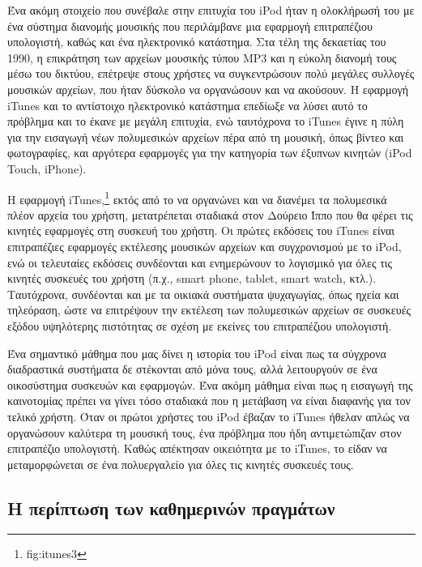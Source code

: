 \documentclass[
]{article}
\begin{document}
Ένα ακόμη στοιχείο που συνέβαλε στην επιτυχία του iPod ήταν η ολοκλήρωσή
του με ένα σύστημα διανομής μουσικής που περιλάμβανε μια εφαρμογή
επιτραπέζιου υπολογιστή, καθώς και ένα ηλεκτρονικό κατάστημα. Στα τέλη
της δεκαετίας του 1990, η επικράτηση των αρχείων μουσικής τύπου MP3 και
η εύκολη διανομή τους μέσω του δικτύου, επέτρεψε στους χρήστες να
συγκεντρώσουν πολύ μεγάλες συλλογές μουσικών αρχείων, που ήταν δύσκολο
να οργανώσουν και να ακούσουν. Η εφαρμογή iTunes και το αντίστοιχο
ηλεκτρονικό κατάστημα επεδίωξε να λύσει αυτό το πρόβλημα και το έκανε με
μεγάλη επιτυχία, ενώ ταυτόχρονα το iTunes έγινε η πύλη για την εισαγωγή
νέων πολυμεσικών αρχείων πέρα από τη μουσική, όπως βίντεο και
φωτογραφίες, και αργότερα εφαρμογές για την κατηγορία των έξυπνων
κινητών (iPod Touch, iPhone).

Η εφαρμογή iTunes,\footnote{fig:itunes3} εκτός από το να οργανώνει και
να διανέμει τα πολυμεσικά πλέον αρχεία του χρήστη, μετατρέπεται σταδιακά
στον Δούρειο Ίππο που θα φέρει τις κινητές εφαρμογές στη συσκευή του
χρήστη. Οι πρώτες εκδόσεις του iTunes είναι επιτραπέζιες εφαρμογές
εκτέλεσης μουσικών αρχείων και συγχρονισμού με το iPod, ενώ οι
τελευταίες εκδόσεις συνδέονται και ενημερώνουν το λογισμικό για όλες τις
κινητές συσκευές του χρήστη (π.χ., smart phone, tablet, smart watch,
κτλ.). Ταυτόχρονα, συνδέονται και με τα οικιακά συστήματα ψυχαγωγίας,
όπως ηχεία και τηλεόραση, ώστε να επιτρέψουν την εκτέλεση των
πολυμεσικών αρχείων σε συσκευές εξόδου υψηλότερης πιστότητας σε σχέση με
εκείνες του επιτραπέζιου υπολογιστή.

Ένα σημαντικό μάθημα που μας δίνει η ιστορία του iPod είναι πως τα
σύγχρονα διαδραστικά συστήματα δε στέκονται από μόνα τους, αλλά
λειτουργούν σε ένα οικοσύστημα συσκευών και εφαρμογών. Ένα ακόμη μάθημα
είναι πως η εισαγωγή της καινοτομίας πρέπει να γίνει τόσο σταδιακά που η
μετάβαση να είναι διαφανής για τον τελικό χρήστη. Όταν οι πρώτοι χρήστες
του iPod έβαζαν το iTunes ήθελαν απλώς να οργανώσουν καλύτερα τη μουσική
τους, ένα πρόβλημα που ήδη αντιμετώπιζαν στον επιτραπέζιο υπολογιστή.
Καθώς απέκτησαν οικειότητα με το iTunes, το είδαν να μεταμορφώνεται σε
ένα πολυεργαλείο για όλες τις κινητές συσκευές τους.

\hypertarget{ux3b7-ux3c0ux3b5ux3c1ux3afux3c0ux3c4ux3c9ux3c3ux3b7-ux3c4ux3c9ux3bd-ux3baux3b1ux3b8ux3b7ux3bcux3b5ux3c1ux3b9ux3bdux3ceux3bd-ux3c0ux3c1ux3b1ux3b3ux3bcux3acux3c4ux3c9ux3bd}{%
\subsection{Η περίπτωση των καθημερινών
πραγμάτων}\label{ux3b7-ux3c0ux3b5ux3c1ux3afux3c0ux3c4ux3c9ux3c3ux3b7-ux3c4ux3c9ux3bd-ux3baux3b1ux3b8ux3b7ux3bcux3b5ux3c1ux3b9ux3bdux3ceux3bd-ux3c0ux3c1ux3b1ux3b3ux3bcux3acux3c4ux3c9ux3bd}}
\end{document}

